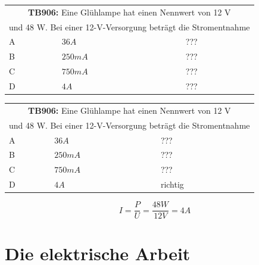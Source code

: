 \begin{frame}
	\begin{small}	
	\begin{tabular}{|l|l|l|}
	\hline
		\multicolumn{3}{|c|}{\textbf{TB906:} Eine Glühlampe hat einen Nennwert von 12 V }\\
		\multicolumn{3}{|c|}{und 48 W. Bei einer 12-V-Versorgung beträgt die Stromentnahme}\\
		\hline
		A & $36 A $ & ??? \\ \hline
		B & $250 mA $ & ??? \\ \hline
		C & $750 mA $ & ??? \\ \hline
		D & $4 A $ & ??? \\ \hline	
	\end{tabular}
	\end{small}
\end{frame}

\begin{frame}
	\begin{small}	
	\begin{tabular}{|l|l|l|}
	\hline
		\multicolumn{3}{|c|}{\textbf{TB906:} Eine Glühlampe hat einen Nennwert von 12 V }\\
		\multicolumn{3}{|c|}{und 48 W. Bei einer 12-V-Versorgung beträgt die Stromentnahme}\\
		\hline
		A & $36 A $ & ??? \\ \hline
		B & $250 mA $ & ??? \\ \hline
		C & $750 mA $ & ??? \\ \hline
		D & $4 A $ & richtig \\ \hline	
	\end{tabular}
	\end{small}
	\vspace{1cm}
	\begin{equation}
		I = \frac{P}{U} = \frac{48W}{12V} = 4A
	\end{equation}
\end{frame}

\section{Die elektrische Arbeit}

